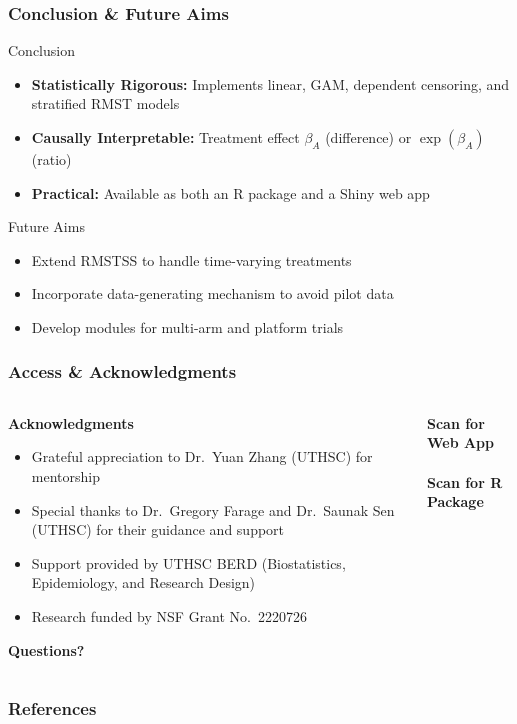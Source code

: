 \documentclass{beamer}
\begin{document}
\begin{frame}
\frametitle{Conclusion \& Future Aims}

\begin{block}{Conclusion}
\begin{itemize}
  \item \textbf{Statistically Rigorous:} Implements linear, GAM, dependent censoring, and stratified RMST models
  \item \textbf{Causally Interpretable:} Treatment effect $\beta_A$ (difference) or $\exp(\beta_A)$ (ratio)
  \item \textbf{Practical:} Available as both an R package and a Shiny web app
\end{itemize}
\end{block}

\begin{block}{Future Aims}
\begin{itemize}
  \item Extend RMSTSS to handle time-varying treatments
  \item Incorporate data-generating mechanism to avoid pilot data
  \item Develop modules for multi-arm and platform trials
\end{itemize}
\end{block}
\end{frame}


\begin{frame}
\frametitle{Access \& Acknowledgments}
\begin{columns}[T]
\begin{column}{0.5\textwidth}
\scriptsize
    \textbf{Acknowledgments}
 \begin{itemize}
        \item Grateful appreciation to Dr.\ Yuan Zhang (UTHSC) for mentorship
        \item Special thanks to Dr.\ Gregory Farage and Dr.\ Saunak Sen (UTHSC) for their guidance and support
        \item Support provided by UTHSC BERD (Biostatistics, Epidemiology, and Research Design)
        \item Research funded by NSF Grant No.\ 2220726
    \end{itemize}
\vfill
\begin{center}
\Huge{\textbf{Questions?}}
\end{center}
\end{column}
    \begin{column}{0.5\textwidth}
    \scriptsize
        \centering
        \textbf{Scan for Web App} \\
        \vspace{2em}
        \\
        \textbf{Scan for R Package} \\
    \end{column}
\end{columns}
\end{frame}

\begin{frame}
\frametitle{References}
\scriptsize


\end{frame}
\end{document}
